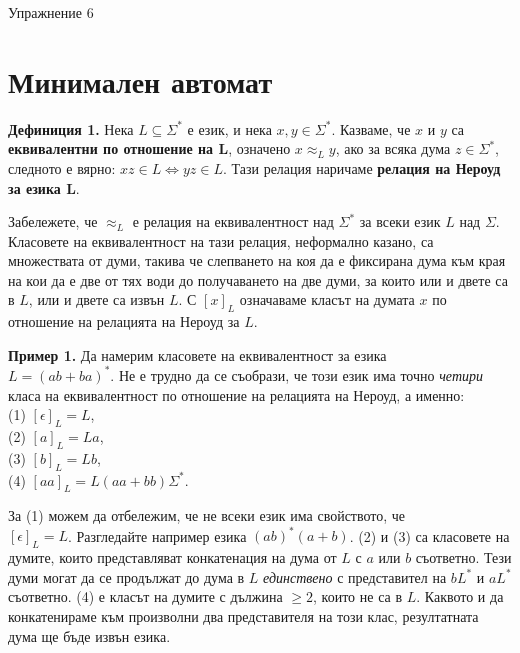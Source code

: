 \documentclass{article}
\begin{document}
\begin{center}
    {\huge Упражнение 6}
\end{center}

\vspace{15pt}

\section{Минимален автомат}
    \textbf{Дефиниция 1.} Нека $L \subseteq \Sigma^*$ е език, и нека $x,y \in \Sigma^*$. 
    Казваме, че $x$ и $y$ са \textbf{еквивалентни по отношение на $\boldsymbol{L}$},
    означено $x \approx_L y$, ако за всяка дума $z \in \Sigma^*$, следното е вярно:
    $xz \in L \iff yz \in L$. Тази релация наричаме \textbf{релация на Нероуд за езика $\boldsymbol{L}$}.

    \vspace{5pt}

    \hspace{15pt} Забележете, че $\approx_L$ е релация на еквивалентност над $\Sigma^*$ за всеки език
    $L$ над $\Sigma$. Класовете на еквивалентност на тази релация, неформално казано,
    са множествата от думи, такива че слепването на коя да е фиксирана дума към края
    на кои да е две от тях
    води до получаването на две думи, за които или и двете са в $L$, или и двете са
    извън $L$. С $[x]_L$ означаваме класът на думата $x$ по отношение на 
    релацията на Нероуд за $L$.  

    \vspace{15pt}
    
    \textbf{Пример 1.} Да намерим класовете на еквивалентност за езика \\
    $L = (ab + ba)^*$. Не е трудно да
    се съобрази, че този език има точно \textit{четири} класа на еквивалентност
    по отношение на релацията на Нероуд, а именно: \\
    (1) $[\epsilon]_L = L$, \\
    (2) $[a]_L = La$, \\
    (3) $[b]_L = Lb$, \\
    (4) $[aa]_L = L(aa + bb)\Sigma^*.$ \\

    \vspace{5pt}

    \hspace{15pt} За (1) можем да отбележим, че не всеки език има свойството, че \\ $[\epsilon]_L = L$.
    Разгледайте например езика $(ab)^*(a+b)$. (2) и (3) са класовете на думите,
    които представляват конкатенация на дума от $L$ с $a$ или $b$ съответно. Тези
    думи могат да се продължат до дума в $L$ \textit{единствено} с представител на $b L^*$ и $a L^*$ съответно. 
    (4) е класът на думите с дължина $\geq 2$, които не са в $L$. Каквото и да 
    конкатенираме към произволни два представителя на този клас, резултатната дума
    ще бъде извън езика.
\end{document}

